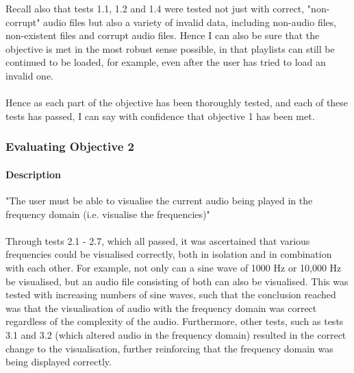 Recall also that tests 1.1, 1.2 and 1.4 were tested not just with correct, "non-corrupt" audio files but also a variety of invalid data, including non-audio files, non-existent files and corrupt audio files. Hence I can also be sure that the objective is met in the most robust sense possible, in that playlists can still be continued to be loaded, for example, even after the user has tried to load an invalid one.

\paragraph{}
Hence as each part of the objective has been thoroughly tested, and each of these tests has passed, I can say with confidence that objective 1 has been met.

\pagebreak
\subsubsection{Evaluating Objective 2}
\paragraph{Description} "The user must be able to visualise the current audio being played in the frequency domain (i.e. visualise
the frequencies)"

\paragraph{}
Through tests 2.1 - 2.7, which all passed, it was ascertained that various frequencies could be visualised correctly, both in isolation and in combination with each other. For example, not only can a sine wave of 1000 Hz or 10,000 Hz be visualised, but an audio file consisting of both can also be visualised. This was tested with increasing numbers of sine waves, such that the conclusion reached was that the visualisation of audio with the frequency domain was correct regardless of the complexity of the audio. Furthermore, other tests, such as tests 3.1 and 3.2 (which altered audio in the frequency domain) resulted in the correct change to the visualisation, further reinforcing that the frequency domain was being displayed correctly.

